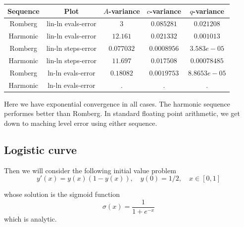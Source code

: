 \begin{table}[H]
    \centering
    \begin{tabular}{c|c||c|c|c}
Sequence & Plot & \(A\)-variance & \(c\)-variance & \(q\)-variance\\\hline
Romberg & lin-ln evals-error & \(3\) & \(0.085281\) & \(0.021208\) \\
Harmonic & lin-ln evals-error & \(12.161\) & \(0.021332\) & \(0.001013\) \\
Romberg & lin-ln steps-error & \(0.077032\) & \(0.0008956\) & \(3.583e-05\) \\
Harmonic & lin-ln steps-error & \(11.697\) & \(0.017508\) & \(0.00078485\) \\
Romberg & ln-ln evals-error & \(0.18082\) & \(0.0019753\) & \(8.8653e-05\) \\
Harmonic & ln-ln evals-error & . & . & . \\
    \end{tabular}
    \label{tab:my_label}
\end{table}

Here we have exponential convergence in all cases. The harmonic sequence performes better than Romberg. In standard floating point arithmetic, we get down to maching level error using either sequence.

\subsection{Logistic curve}

Then we will consider the following initial value problem
\begin{equation}\label{43}
y'(x) = y(x)(1-y(x)),\quad y(0) = 1/2, \quad x\in [0,1]
\end{equation}

whose solution is the sigmoid function
\[
\sigma(x) = \frac{1}{1 + e^{-x}}
\]
which is analytic.

